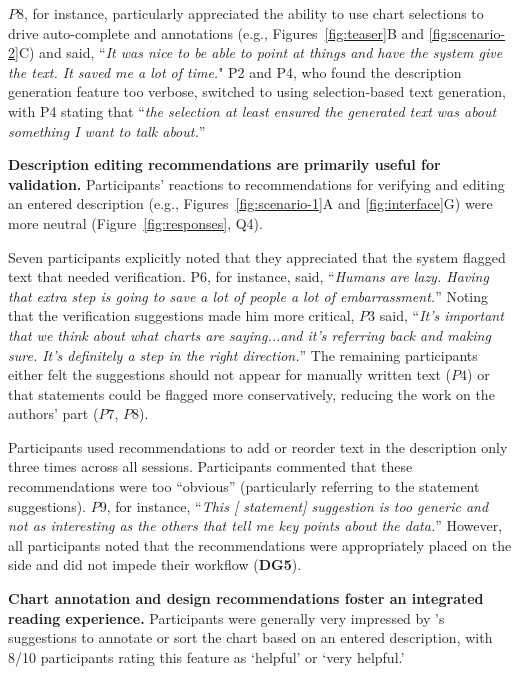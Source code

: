 $P8$, for instance, particularly appreciated the ability to use chart selections to drive auto-complete and annotations (e.g., Figures~\ref{fig:teaser}B and \ref{fig:scenario-2}C) and said, ``\textit{It was nice to be able to point at things and have the system give the text. It saved me a lot of time.}"
P2 and P4, who found the description generation feature too verbose, switched to using selection-based text generation, with P4 stating that ``\textit{the selection at least ensured the generated text was about something I want to talk about.}''

\vspace{.5em}
\noindent\textbf{Description editing recommendations are primarily useful for validation.}
Participants' reactions to recommendations for verifying and editing an entered description (e.g., Figures~\ref{fig:scenario-1}A and \ref{fig:interface}G) were more neutral (Figure~\ref{fig:responses}, Q4).

Seven participants explicitly noted that they appreciated that the system flagged text that needed verification.
P6, for instance, said, ``\textit{Humans are lazy. Having that extra step is going to save a lot of people a lot of embarrassment.}''
Noting that the verification suggestions made him more critical, $P3$ said, ``\textit{It's important that we think about what charts are saying...and it's referring back and making sure. It's definitely a step in the right direction.}''
The remaining participants either felt the suggestions should not appear for manually written text ($P4$) or that statements could be flagged more conservatively, reducing the work on the authors' part ($P7$, $P8$).

Participants used recommendations to add or reorder text in the description only three times across all sessions. Participants commented that these recommendations were too ``obvious'' (particularly referring to the  statement suggestions).
$P9$, for instance, ``\textit{This [ statement] suggestion is too generic and not as interesting as the others that tell me key points about the data.}''
However, all participants noted that the recommendations were appropriately placed on the side and did not impede their workflow (\textbf{DG5}).

\vspace{.5em}
\noindent\textbf{Chart annotation and design recommendations foster an integrated reading experience.}
Participants were generally very impressed by \pluto's suggestions to annotate or sort the chart based on an entered description, with 8/10 participants rating this feature as `helpful' or `very helpful.'

